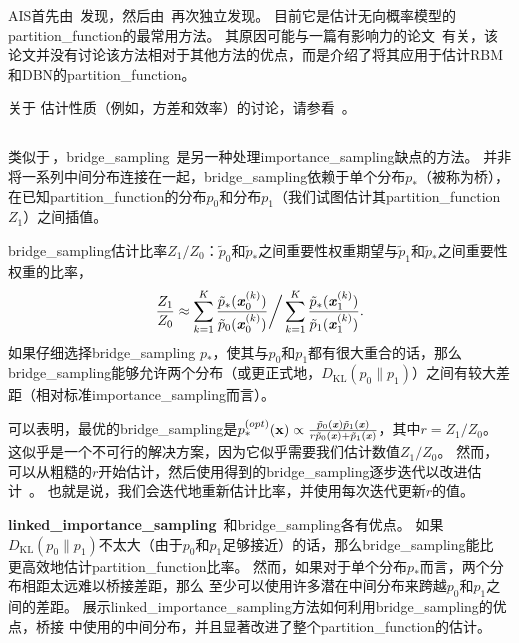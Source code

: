 
\gls{AIS}首先由~\cite{Jarzynski1997}发现，然后由~\cite{Neal-2001}再次独立发现。
目前它是估计无向概率模型的\gls{partition_function}的最常用方法。
其原因可能与一篇有影响力的论文~\citep{Salakhutdinov+Murray-2008}有关，该论文并没有讨论该方法相对于其他方法的优点，而是介绍了将其应用于估计\gls{RBM}和\gls{DBN}的\gls{partition_function}。


关于\,\,估计性质（例如，方差和效率）的讨论，请参看~\cite{Neal-2001}。


\subsection{}
\label{sec:bridge_sampling}
类似于\,，\gls{bridge_sampling}~\citep{Bennet76}是另一种处理\gls{importance_sampling}缺点的方法。
并非将一系列中间分布连接在一起，\gls{bridge_sampling}依赖于单个分布$p_*$（被称为桥），在已知\gls{partition_function}的分布$p_0$和分布$p_1$（我们试图估计其\gls{partition_function} $Z_1$）之间插值。


\gls{bridge_sampling}估计比率$Z_1 / Z_0$：$\tilde{p}_0$和$\tilde{p}_*$之间重要性权重期望与$\tilde{p}_1$和$\tilde{p}_*$之间重要性权重的比率，
\begin{equation}
	\frac{Z_1}{ Z_0} \approx \sum_{k=1}^K \frac{ \tilde{p}_*(\boldsymbol{\mathit{x}}_0^{(k)}) }{ \tilde{p}_0(\boldsymbol{\mathit{x}}_0^{(k)}) } \bigg/ \sum_{k=1}^K \frac{ \tilde{p}_*(\boldsymbol{\mathit{x}}_1^{(k)}) }{ \tilde{p}_1(\boldsymbol{\mathit{x}}_1^{(k)}) } .
\end{equation}
如果仔细选择\gls{bridge_sampling} $p_*$，使其与$p_0$和$p_1$都有很大重合的话，那么\gls{bridge_sampling}能够允许两个分布（或更正式地，$D_{\text{KL}}(p_0 \| p_1)$）之间有较大差距（相对标准\gls{importance_sampling}而言）。


可以表明，最优的\gls{bridge_sampling}是$p_*^{(opt)} (\mathbf{x}) \propto \frac{ \tilde{p}_0(\boldsymbol{\mathit{x}}) \tilde{p}_1(\boldsymbol{\mathit{x}}) }{ r\tilde{p}_0(\boldsymbol{\mathit{x}}) + \tilde{p}_1(\boldsymbol{\mathit{x}}) }$，其中$r = Z_1 / Z_0$。
这似乎是一个不可行的解决方案，因为它似乎需要我们估计数值$Z_1 / Z_0$。
然而，可以从粗糙的$r$开始估计，然后使用得到的\gls{bridge_sampling}逐步迭代以改进估计~\citep{Neal05estimatingratios}。
也就是说，我们会迭代地重新估计比率，并使用每次迭代更新$r$的值。


\textbf{\gls{linked_importance_sampling}}
\,和\gls{bridge_sampling}各有优点。
如果$D_{\text{KL}}(p_0 \| p_1)$不太大（由于$p_0$和$p_1$足够接近）的话，那么\gls{bridge_sampling}能比\,\,更高效地估计\gls{partition_function}比率。
然而，如果对于单个分布$p_*$而言，两个分布相距太远难以桥接差距，那么\,\,至少可以使用许多潜在中间分布来跨越$p_0$和$p_1$之间的差距。
\cite{Neal05estimatingratios}展示\gls{linked_importance_sampling}方法如何利用\gls{bridge_sampling}的优点，桥接\,\,中使用的中间分布，并且显著改进了整个\gls{partition_function}的估计。


